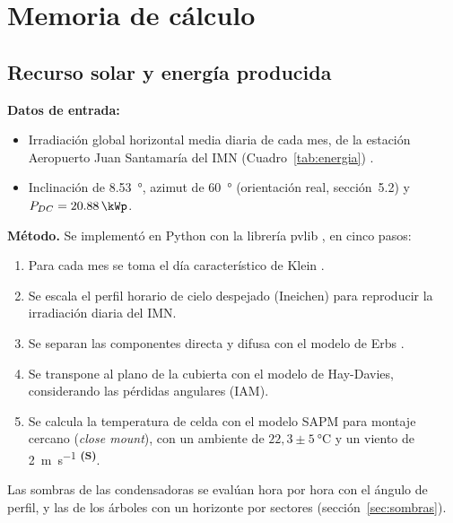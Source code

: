 \documentclass[12pt]{article}
\newcommand{\supuesto}{\textsuperscript{\textcolor{orange!80!black}{\textbf{(S)}}}}
\begin{document}
\section{Memoria de cálculo}
\subsection{Recurso solar y energía producida}
\label{sec:energia}
\textbf{Datos de entrada:}
\begin{itemize}
\item Irradiación global horizontal media diaria de cada mes, de la estación Aeropuerto Juan Santamaría del IMN (Cuadro~\ref{tab:energia}) \cite{imnRad}.
\item Inclinación de \SI{8.53}{\degree}, azimut de \SI{60}{\degree} (orientación real, sección~5.2) y $P_{DC}=\SI{20.88}{\kWp}$.
\end{itemize}

\textbf{Método.} Se implementó en Python con la librería pvlib \cite{pvlib}, en cinco pasos:
\begin{enumerate}
\item Para cada mes se toma el día característico de Klein \cite{klein1977}.
\item Se escala el perfil horario de cielo despejado (Ineichen) para reproducir la irradiación diaria del IMN.
\item Se separan las componentes directa y difusa con el modelo de Erbs \cite{erbs1982}.
\item Se transpone al plano de la cubierta con el modelo de Hay-Davies, considerando las pérdidas angulares (IAM).
\item Se calcula la temperatura de celda con el modelo SAPM para montaje cercano (\emph{close mount}), con un ambiente de $22{,}3 \pm \SI{5}{\celsius}$ y un viento de \SI{2}{\meter\per\second} \supuesto{}.
\end{enumerate}
Las sombras de las condensadoras se evalúan hora por hora con el ángulo de perfil, y las de los árboles con un horizonte por sectores (sección~\ref{sec:sombras}).
\end{document}
